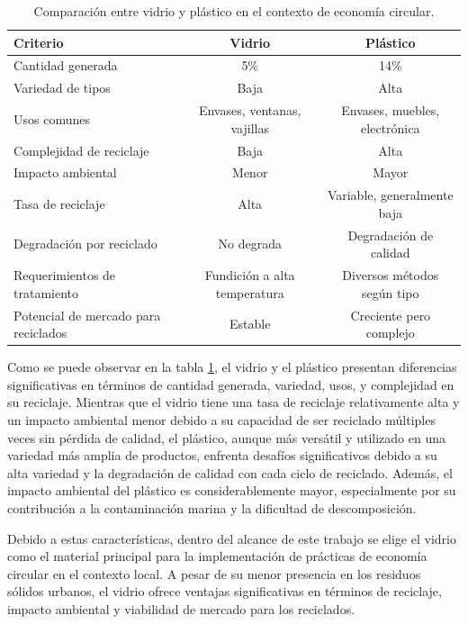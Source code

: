 \documentclass[main.tex]{subfiles}
\begin{document}
\begin{table}[h!]
\centering
\begin{tabular}{|l|c|c|}
\hline
\textbf{Criterio} & \textbf{Vidrio} & \textbf{Plástico} \\ \hline
Cantidad generada & 5\% & 14\% \\ \hline
Variedad de tipos & Baja & Alta \\ \hline
Usos comunes & Envases, ventanas, vajillas & Envases, muebles, electrónica \\ \hline
Complejidad de reciclaje & Baja & Alta \\ \hline
Impacto ambiental & Menor & Mayor \\ \hline
Tasa de reciclaje & Alta & Variable, generalmente baja \\ \hline
Degradación por reciclado & No degrada & Degradación de calidad \\ \hline
Requerimientos de tratamiento & Fundición a alta temperatura & Diversos métodos según tipo \\ \hline
Potencial de mercado para reciclados & Estable & Creciente pero complejo \\ \hline
\end{tabular}
\caption{Comparación entre vidrio y plástico en el contexto de economía circular.}
\label{tab:glass-vs-plastic}
\end{table}

Como se puede observar en la tabla \ref{tab:glass-vs-plastic}, el vidrio y el plástico presentan diferencias significativas en términos de cantidad generada, variedad, usos, y complejidad en su reciclaje. Mientras que el vidrio tiene una tasa de reciclaje relativamente alta y un impacto ambiental menor debido a su capacidad de ser reciclado múltiples veces sin pérdida de calidad, el plástico, aunque más versátil y utilizado en una variedad más amplia de productos, enfrenta desafíos significativos debido a su alta variedad y la degradación de calidad con cada ciclo de reciclado. Además, el impacto ambiental del plástico es considerablemente mayor, especialmente por su contribución a la contaminación marina y la dificultad de descomposición.

Debido a estas características, dentro del alcance de este trabajo se elige el vidrio como el material principal para la implementación de prácticas de economía circular en el contexto local. A pesar de su menor presencia en los residuos sólidos urbanos, el vidrio ofrece ventajas significativas en términos de reciclaje, impacto ambiental y viabilidad de mercado para los reciclados. 
\end{document}
